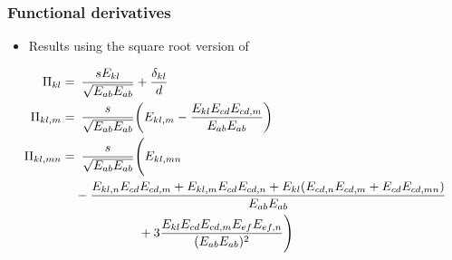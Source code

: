 \documentclass[10pt]{beamer}
\begin{document}
\begin{frame}
\frametitle{Functional derivatives}
\begin{itemize}
    \item Results using the square root version of \PP
\end{itemize}
\begin{align*}
    \Pi_{kl} =&\enspace \frac{s E_{kl}}{\sqrt{E_{ab}E_{ab}}} + \frac{\delta_{kl}}{d} \\
    \Pi_{kl,m} =&\enspace \frac{s}{\sqrt{E_{ab}E_{ab}}} \qty(E_{kl,m} - \frac{E_{kl}E_{cd}E_{cd,m}}{E_{ab}E_{ab}}) \\
    \Pi_{kl,mn} =&\enspace \frac{s}{\sqrt{E_{ab}E_{ab}}} \Biggl(E_{kl,mn} \\ 
    &-\frac{E_{kl,n}E_{cd}E_{cd,m} + E_{kl,m}E_{cd}E_{cd,n} + E_{kl}(E_{cd,n}E_{cd,m} + E_{cd}E_{cd,mn})}{E_{ab}E_{ab}} \\
    &\phantom{\frac{s}{\sqrt{E_{ab}E_{ab}}} \Biggl(} + 3\frac{E_{kl}E_{cd}E_{cd,m}E_{ef}E_{ef,n}}{(E_{ab}E_{ab})^2} \Biggr)
\end{align*}
\end{frame}
\end{document}
